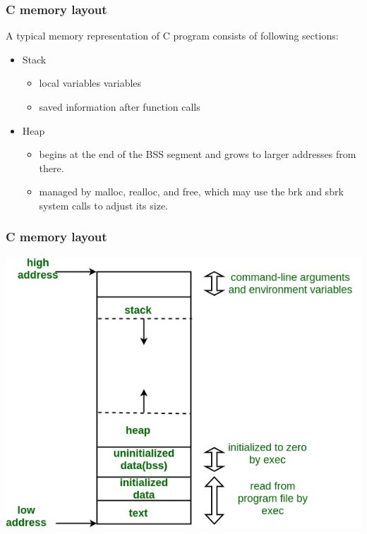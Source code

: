 \documentclass[serif,mathserif]{beamer}
\begin{document}
\begin{frame}
  \frametitle{C memory layout}
  A typical memory representation of C program consists of following sections:
  \begin{itemize}
  	\item Stack
  		\begin{itemize}
  			\item local variables variables
  			\item saved information after function calls
  		\end{itemize}
  	\item Heap
  		\begin{itemize}
  			\item begins at the end of the BSS segment and grows to larger addresses from there.
  			\item managed by malloc, realloc, and free, which may use the brk and sbrk system calls to adjust its size.
  		\end{itemize}
  \end{itemize}
\end{frame}

\begin{frame}
  \frametitle{C memory layout}
  \begin{center}
    \includegraphics[scale=0.45]{memoryLayoutC.jpg}
  \end{center}

\end{frame}


\end{document}
